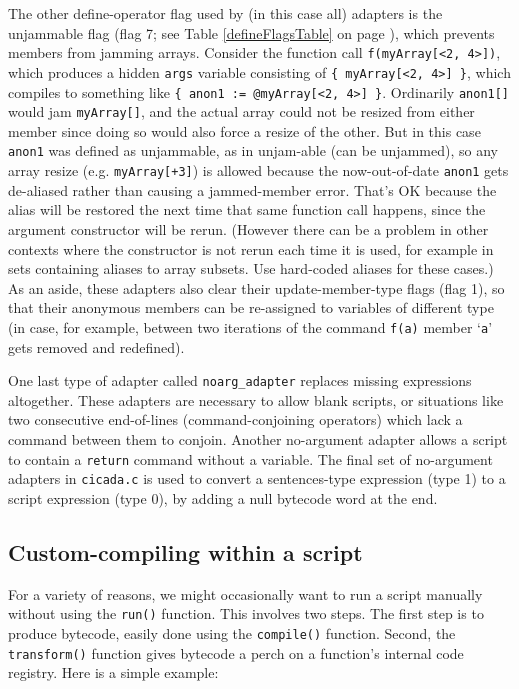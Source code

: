 \documentclass{article}
\begin{document}
The other define-operator flag used by (in this case all) adapters is the unjammable flag (flag 7; see Table \ref{defineFlagsTable} on page \pageref{defineFlagsTable}), which prevents members from jamming arrays.  Consider the function call \verb#f(myArray[<2, 4>])#, which produces a hidden \verb$args$ variable consisting of \verb${ myArray[<2, 4>] }$, which compiles to something like \verb${ anon1 := @myArray[<2, 4>] }$.  Ordinarily \verb$anon1[]$ would jam \verb$myArray[]$, and the actual array could not be resized from either member since doing so would also force a resize of the other.  But in this case \verb$anon1$ was defined as unjammable, as in unjam-able (can be unjammed), so any array resize (e.g. \verb#myArray[+3]#) is allowed because the now-out-of-date \verb$anon1$ gets de-aliased rather than causing a jammed-member error.  That's OK because the alias will be restored the next time that same function call happens, since the argument constructor will be rerun.  (However there can be a problem in other contexts where the constructor is not rerun each time it is used, for example in sets containing aliases to array subsets.  Use hard-coded aliases for these cases.)  As an aside, these adapters also clear their update-member-type flags (flag 1), so that their anonymous members can be re-assigned to variables of different type (in case, for example, between two iterations of the command \verb#f(a)# member `\verb#a#' gets removed and redefined).

One last type of adapter called \verb#noarg_adapter# replaces missing expressions altogether.  These adapters are necessary to allow blank scripts, or situations like two consecutive end-of-lines (command-conjoining operators) which lack a command between them to conjoin.  Another no-argument adapter allows a script to contain a \verb#return# command without a variable.  The final set of no-argument adapters in \verb#cicada.c# is used to convert a sentences-type expression (type 1) to a script expression (type 0), by adding a null bytecode word at the end.\\


 



\subsection{Custom-compiling within a script}

For a variety of reasons, we might occasionally want to run a script manually without using the \verb#run()# function.  This involves two steps.  The first step is to produce bytecode, easily done using the \verb#compile()# function.  Second, the \verb#transform()# function gives bytecode a perch on a function's internal code registry.  Here is a simple example:
\end{document}
